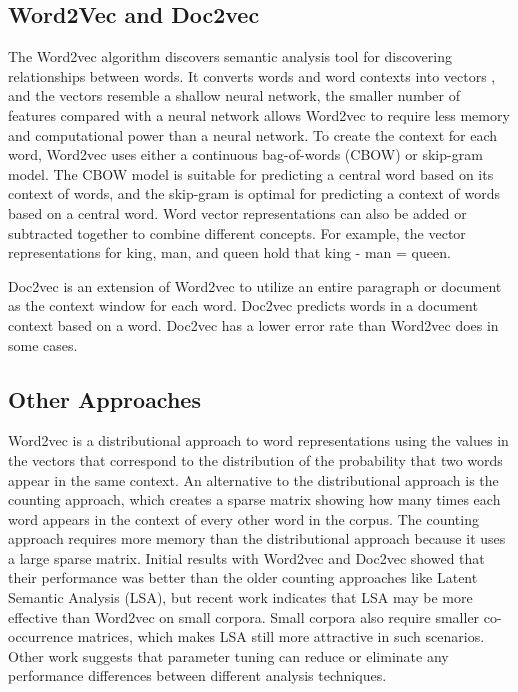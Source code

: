 \documentclass[10pt,twocolumn]{article}
\begin{document}
\subsection{Word2Vec and Doc2vec}
The Word2vec algorithm discovers semantic analysis tool for discovering relationships between words.  It converts words and word contexts into vectors \cite{a4,a5,a6}, and the vectors resemble a shallow neural network, the smaller number of features compared with a neural network allows Word2vec to require less memory and computational power than a neural network.  To create the context for each word, Word2vec uses either a continuous bag-of-words (CBOW) or skip-gram model.  The CBOW model is suitable for predicting a central word based on its context of words, and the skip-gram is optimal for predicting a context of words based on a central word.   Word vector representations can also be added or subtracted together to combine different concepts.  For example, the vector representations for king, man, and queen hold that king - man = queen.

Doc2vec is an extension of Word2vec to utilize an entire paragraph or document as the context window for each word. \cite{a7,a8}  Doc2vec predicts words in a document context based on a word.  Doc2vec has a lower error rate than Word2vec does in some cases.

\subsection{Other Approaches}
Word2vec is a distributional approach to word representations using the values in the vectors that correspond to the distribution of the probability that two words appear in the same context.  An alternative to the distributional approach is the counting approach, which creates a sparse matrix showing how many times each word appears in the context of every other word in the corpus.  The counting approach requires more memory than the distributional approach because it uses a large sparse matrix.  Initial results with Word2vec and Doc2vec showed that their performance was better than the older counting approaches like Latent Semantic Analysis (LSA), but recent work indicates that LSA may be more effective than Word2vec on small corpora. \cite{a10}  Small corpora also require smaller co-occurrence matrices, which makes LSA still more attractive in such scenarios.  Other work suggests that parameter tuning can reduce or eliminate any performance differences between different analysis techniques. \cite{a11}
  
\end{document}
